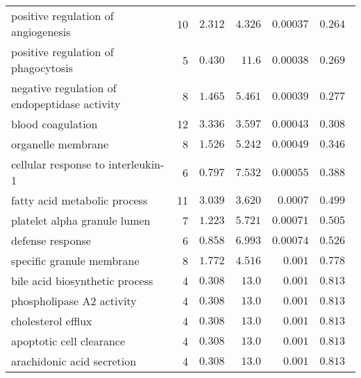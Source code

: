 \begin{longtable}{|l|r|r|r|r|r|}
    positive regulation of angiogenesis               & 10                      & $ 2.312$                & $ 4.326$   & $0.00037$            & $ 0.264~~$                    \\
    positive regulation of phagocytosis               & 5                       & $ 0.430$                & $  11.6$     & $0.00038$            & $ 0.269~~$                    \\
    negative regulation of endopeptidase activity     & 8                       & $ 1.465$                & $ 5.461$   & $0.00039$            & $ 0.277~~$                    \\
    blood coagulation                                 & 12                      & $ 3.336$                & $ 3.597$   & $0.00043$            & $ 0.308~~$                    \\
    organelle membrane                                & 8                       & $ 1.526$                & $ 5.242$   & $0.00049$            & $ 0.346~~$                    \\
    cellular response to interleukin-1                & 6                       & $ 0.797$                & $ 7.532$   & $0.00055$            & $ 0.388~~$                    \\
    fatty acid metabolic process                      & 11                      & $ 3.039$                & $ 3.620$   & $0.0007$             & $ 0.499~~$                    \\
    platelet alpha granule lumen                      & 7                       & $ 1.223$                & $ 5.721$   & $0.00071$            & $ 0.505~~$                    \\
    defense response                                  & 6                       & $ 0.858$                & $ 6.993$   & $0.00074$            & $ 0.526~~$                    \\
    specific granule membrane                         & 8                       & $ 1.772$                & $ 4.516$   & $ 0.001$             & $ 0.778~~$                    \\
    bile acid biosynthetic process                    & 4                       & $ 0.308$                & $  13.0$     & $ 0.001$             & $ 0.813~~$                    \\
    phospholipase A2 activity                         & 4                       & $ 0.308$                & $  13.0$     & $ 0.001$             & $ 0.813~~$                    \\
    cholesterol efflux                                & 4                       & $ 0.308$                & $  13.0$     & $ 0.001$             & $ 0.813~~$                    \\
    apoptotic cell clearance                          & 4                       & $ 0.308$                & $  13.0$     & $ 0.001$             & $ 0.813~~$                    \\
    arachidonic acid secretion                        & 4                       & $ 0.308$                & $  13.0$     & $ 0.001$             & $ 0.813~~$                    \\
\end{longtable}
